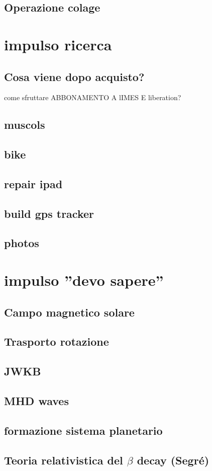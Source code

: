 \subsection{Operazione colage}

\section{impulso ricerca}

\subsection{Cosa viene dopo acquisto?}
come sfruttare ABBONAMENTO A lIMES E liberation?

\subsection{muscols}

\subsection{bike}

\subsection{repair ipad}

\subsection{build gps tracker}

\subsection{photos}


\section{impulso ''devo sapere''}

\subsection{Campo magnetico solare}

\subsection{Trasporto rotazione}

\subsection{JWKB}

\subsection{MHD waves}

\subsection{formazione sistema planetario}

\subsection{Teoria relativistica del $\beta$ decay (Segr\'e)}
